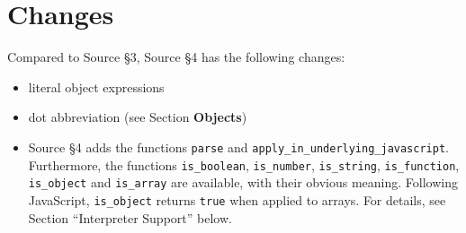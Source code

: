 





\section*{Changes}

Compared to Source \S 3, Source \S 4 has the following changes:
\begin{itemize}
\item literal object expressions
\item dot abbreviation (see Section \textbf{Objects})
\item Source \S 4 adds the functions \lstinline{parse} and
\lstinline{apply_in_underlying_javascript}. 
Furthermore, the functions \lstinline{is_boolean}, \lstinline{is_number},
\lstinline{is_string}, \lstinline{is_function}, \lstinline{is_object} and
\lstinline{is_array} are available, with their obvious meaning.
Following JavaScript, \lstinline{is_object} returns \lstinline{true} when
applied to arrays. For details, see 
Section ``Interpreter Support'' below.
\end{itemize}



